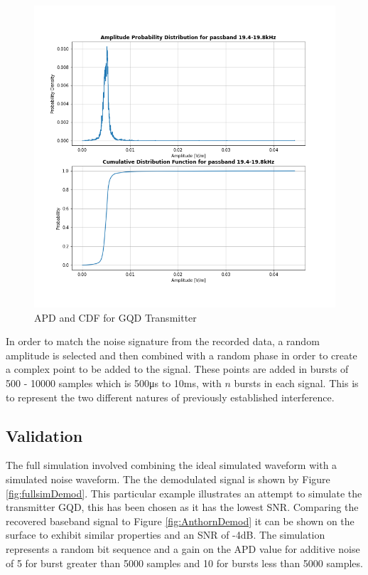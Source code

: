 \begin{figure}[h!]
    \centering
    \includegraphics[width = \textwidth]{figs/sim/apdcdf.png}
    \caption{APD and CDF for GQD Transmitter}
    \label{fig:apdcdf}
\end{figure}

In order to match the noise signature from the recorded data, a random amplitude is selected and then combined with a random phase in order to create a complex point to be added to the signal. These points are added in bursts of 500 - 10000 samples which is 500\si{\micro\second} to 10\si{\milli\second}, with $n$ bursts in each signal. This is to represent the two different natures of previously established interference.

\pagebreak
\subsection{Validation}
The full simulation involved combining the ideal simulated waveform with a simulated noise waveform. The the demodulated signal is shown by Figure \ref{fig:fullsimDemod}. This particular example illustrates an attempt to simulate the transmitter GQD, this has been chosen as it has the lowest SNR. Comparing the recovered baseband signal to Figure \ref{fig:AnthornDemod} it can be shown on the surface to exhibit similar properties and an SNR of -4dB. The simulation represents a random bit sequence and a gain on the APD value for additive noise of 5 for burst greater than 5000 samples and 10 for bursts less than 5000 samples.

